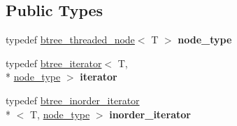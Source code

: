 \subsection*{Public Types}
\begin{DoxyCompactItemize}
\item 
\hypertarget{classtree_1_1cThreadedRep_aa2df7e02a980552a4a16e4c669049654}{typedef \hyperlink{structtree_1_1btree__threaded__node}{btree\-\_\-threaded\-\_\-node}$<$ T $>$ {\bfseries node\-\_\-type}}\label{classtree_1_1cThreadedRep_aa2df7e02a980552a4a16e4c669049654}

\item 
\hypertarget{classtree_1_1cThreadedRep_ac9f5a3607794b24b7cda7d2288ce2cc8}{typedef \hyperlink{classtree_1_1btree__iterator}{btree\-\_\-iterator}$<$ T, \\*
\hyperlink{structtree_1_1btree__threaded__node}{node\-\_\-type} $>$ {\bfseries iterator}}\label{classtree_1_1cThreadedRep_ac9f5a3607794b24b7cda7d2288ce2cc8}

\item 
\hypertarget{classtree_1_1cThreadedRep_aec013eb2bc9a327239d1366f039ed94e}{typedef \hyperlink{classtree_1_1btree__inorder__iterator}{btree\-\_\-inorder\-\_\-iterator}\\*
$<$ T, \hyperlink{structtree_1_1btree__threaded__node}{node\-\_\-type} $>$ {\bfseries inorder\-\_\-iterator}}\label{classtree_1_1cThreadedRep_aec013eb2bc9a327239d1366f039ed94e}

\end{DoxyCompactItemize}
